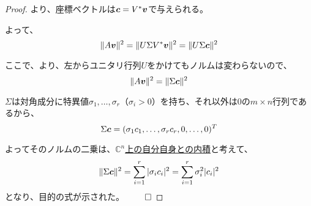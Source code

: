 \documentclass[../../../topic_linear-algebra]{subfiles}
\begin{document}
\begin{proof}
  より、座標ベクトルは$\vb*{c} = V^* \vb*{v}$で与えられる。

  よって、
  \begin{equation*}
    \| A \vb*{v} \|^2 = \| U \Sigma V^* \vb*{v} \|^2 = \| U \Sigma \vb*{c} \|^2
  \end{equation*}

  ここで、より、左からユニタリ行列$U$をかけてもノルムは変わらないので、
  \begin{equation*}
    \| A \vb*{v} \|^2 = \| \Sigma \vb*{c} \|^2
  \end{equation*}
  
  $\Sigma$は対角成分に特異値$\sigma_1, \dots, \sigma_r$（$\sigma_i > 0$）を持ち、それ以外は0の$m \times n$行列であるから、
  \begin{equation*}
    \Sigma \vb*{c} = (\sigma_1 c_1, \dots, \sigma_r c_r, 0, \dots, 0)^T
  \end{equation*}
  
  よってそのノルムの二乗は、\hyperref[def:standard-inner-product-Cn]{$\mathbb{C}^n$上の自分自身との内積}と考えて、
  \begin{equation*}
    \| \Sigma \vb*{c} \|^2 = \sum_{i=1}^r |\sigma_i c_i|^2 = \sum_{i=1}^r \sigma_i^2 |c_i|^2
  \end{equation*}
  となり、目的の式が示された。 $\qed$
\end{proof}
\end{document}
